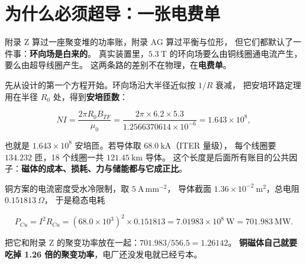 
\section{为什么必须超导：一张电费单}
\label{sec:app-am-sc}

附录 Z 算过一座聚变堆的功率账，附录 AG 算过平衡与位形，
但它们都默认了一件事：\textbf{环向场是白来的}。
真实装置里，$5.3\ \mathrm{T}$ 的环向场要么由铜线圈通电流产生，要么由超导线圈产生。
这两条路的差别不在物理，在\textbf{电费单}。

先从设计的第一个方程开始。环向场沿大半径近似按 $1/R$ 衰减，
把安培环路定理用在半径 $R_0$ 处，得到\textbf{安培匝数}：

\begin{equation}
NI=\frac{2\pi R_0B_{TF}}{\mu_0}
=\frac{2\pi\times6.2\times5.3}{1.2566370614\times10^{-6}}
=1.643\times10^{8},
\label{eq:app-am-ampere}
\end{equation}

也就是 $1.643\times10^{8}$ 安培匝。若导体取 $68.0\ \mathrm{kA}$（ITER 量级），
每个线圈要 $134.232$ 匝，18 个线圈一共 $121.45\ \mathrm{km}$ 导体。
这个长度是后面所有账目的公共因子：\textbf{磁体的成本、损耗、力与储能都与它成正比}。

铜方案的电流密度受水冷限制，取 $5\ \mathrm{A\,mm^{-2}}$，
导体截面 $1.36\times10^{-2}\ \mathrm{m^{2}}$，总电阻 $0.151813\ \Omega$，
于是稳态电耗

\begin{equation}
P_{Cu}=I^{2}R_{Cu}
=(68.0\times10^{3})^{2}\times0.151813
=7.01983\times10^{8}\ \mathrm{W}
=701.983\ \mathrm{MW}.
\label{eq:app-am-pcu}
\end{equation}

把它和附录 Z 的聚变功率放在一起：$701.983/556.5=1.26142$。
\textbf{铜磁体自己就要吃掉 1.26 倍的聚变功率}，电厂还没发电就已经亏本。

